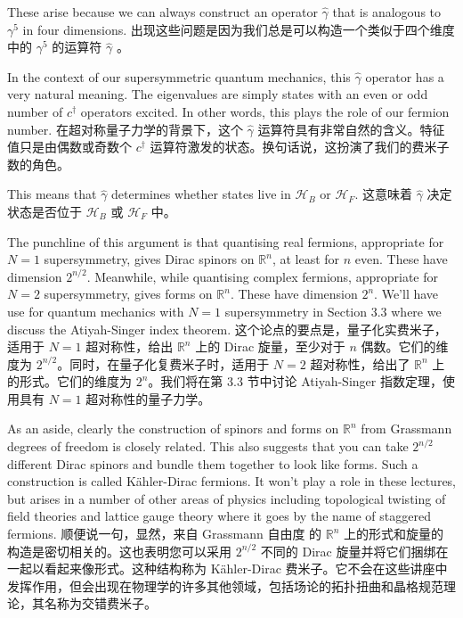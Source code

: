 \documentclass{ctexart}
\begin{document}
\begin{paracol}{2}
These arise because we can always construct an operator $\hat{\gamma}$ that is analogous to $\gamma^5$ in four dimensions.
\switchcolumn
出现这些问题是因为我们总是可以构造一个类似于四个维度中的 $\gamma^5$ 的运算符 $\hat{\gamma}$ 。
\switchcolumn*

In the context of our supersymmetric quantum mechanics, this $\hat{\gamma}$ operator has a very natural meaning. The eigenvalues are simply states with an even or odd number of $c^{\dagger}$ operators excited. In other words, this plays the role of our fermion number.
\switchcolumn
在超对称量子力学的背景下，这个 $\hat{\gamma}$ 运算符具有非常自然的含义。特征值只是由偶数或奇数个 $c^{\dagger}$ 运算符激发的状态。换句话说，这扮演了我们的费米子数的角色。
\switchcolumn*

This means that $\hat{\gamma}$ determines whether states live in $\mathcal{H}_B$ or $\mathcal{H}_F$.
\switchcolumn
这意味着 $\hat{\gamma}$ 决定状态是否位于 $\mathcal{H}_B$ 或 $\mathcal{H}_F$ 中。
\switchcolumn*

The punchline of this argument is that quantising real fermions, appropriate for $N = 1$ supersymmetry, gives Dirac spinors on $\mathbb{R}^{n}$, at least for $n$ even. These have dimension $2^{n/2}$. Meanwhile, while quantising complex fermions, appropriate for $N = 2$ supersymmetry, gives forms on $\mathbb{R}^{n}$. These have dimension $2^n$. We'll have use for quantum mechanics with $N = 1$ supersymmetry in Section 3.3 where we discuss the Atiyah-Singer index theorem.
\switchcolumn
这个论点的要点是，量子化实费米子，适用于 $N = 1$ 超对称性，给出 $\mathbb{R}^{n}$ 上的 Dirac 旋量，至​​少对于 $n$ 偶数。它们的维度为 $2^{n/2}$。同时，在量子化复费米子时，适用于 $N = 2$ 超对称性，给出了 $\mathbb{R}^{n}$ 上的形式。它们的维度为 $2^n$。我们将在第 3.3 节中讨论 Atiyah-Singer 指数定理，使用具有 $N = 1$ 超对称性的量子力学。
\switchcolumn*

As an aside, clearly the construction of spinors and forms on $\mathbb{R}^{n}$ from Grassmann degrees of freedom is closely related. This also suggests that you can take $2^{n/2}$ different Dirac spinors and bundle them together to look like forms. Such a construction is called Kähler-Dirac fermions. It won't play a role in these lectures, but arises in a number of other areas of physics including topological twisting of field theories and lattice gauge theory where it goes by the name of staggered fermions.
\switchcolumn
顺便说一句，显然，来自 Grassmann 自由度 的 $\mathbb{R}^{n}$ 上的形式和旋量的构造是密切相关的。这也表明您可以采用 $2^{n/2}$ 不同的 Dirac 旋量并将它们捆绑在一起以看起来像形式。这种结构称为 Kähler-Dirac 费米子。它不会在这些讲座中发挥作用，但会出现在物理学的许多其他领域，包括场论的拓扑扭曲和晶格规范理论，其名称为交错费米子。
\switchcolumn*


\end{paracol}
\end{document}
